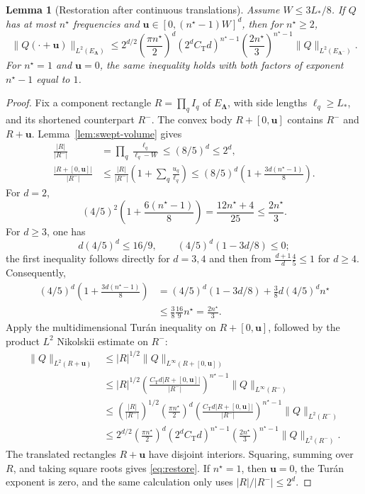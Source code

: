 \documentclass[11pt]{article}
\newtheorem{lemma}{Lemma}
\begin{document}
\begin{lemma}[Restoration after continuous translations]\label{lem:block-restoration}
Assume $W\le3L_*/8$. If $Q$ has at most $n^\star$ frequencies and $\bm u\in[0,(n^\star-1)W]^d$, then for $n^\star\ge2$,
\begin{equation}\label{eq:restore}
\|Q(\cdot+\bm u)\|_{L^2(E_{\bm\Lambda})}\le2^{d/2}\left(\frac{\pi n^\star}{2}\right)^d(2^dC_{\mathrm T}d)^{n^\star-1}\left(\frac{2n^\star}{3}\right)^{n^\star-1}\|Q\|_{L^2(E_{\bm\Lambda^-})}.
\end{equation}
For $n^\star=1$ and $\bm u=0$, the same inequality holds with both factors of exponent $n^\star-1$ equal to $1$.
\end{lemma}
\begin{proof}
Fix a component rectangle $R=\prod_q I_q$ of $E_{\bm\Lambda}$, with side lengths $\ell_q\ge L_*$, and its shortened counterpart $R^-$. The convex body $R+[0,\bm u]$ contains $R^-$ and $R+\bm u$. Lemma~\ref{lem:swept-volume} gives
\begin{align*}
\frac{|R|}{|R^-|}&=\prod_q\frac{\ell_q}{\ell_q-W}\le(8/5)^d\le2^d,\\
\frac{|R+[0,\bm u]|}{|R^-|}&\le\frac{|R|}{|R^-|}\left(1+\sum_q\frac{u_q}{\ell_q}\right)\le(8/5)^d\left(1+\frac{3d(n^\star-1)}8\right).
\end{align*}
For $d=2$,
\[
(4/5)^2\left(1+\frac{6(n^\star-1)}8\right)=\frac{12n^\star+4}{25}\le\frac{2n^\star}{3}.
\]
For $d\ge3$, one has
\[
d(4/5)^d\le16/9,\qquad (4/5)^d(1-3d/8)\le0;
\]
the first inequality follows directly for $d=3,4$ and then from $\frac{d+1}{d}\frac45\le1$ for $d\ge4$. Consequently,
\begin{align*}
(4/5)^d\left(1+\frac{3d(n^\star-1)}8\right)&=(4/5)^d(1-3d/8)+\frac38d(4/5)^d n^\star\\
&\le\frac38\frac{16}{9}n^\star=\frac{2n^\star}{3}.
\end{align*}
Apply the multidimensional Tur\'an inequality on $R+[0,\bm u]$, followed by the product $L^2$ Nikolskii estimate on $R^-$:
\begin{align*}
\|Q\|_{L^2(R+\bm u)}&\le|R|^{1/2}\|Q\|_{L^\infty(R+[0,\bm u])}\\
&\le|R|^{1/2}\left(\frac{C_{\mathrm T}d|R+[0,\bm u]|}{|R^-|}\right)^{n^\star-1}\|Q\|_{L^\infty(R^-)}\\
&\le\left(\frac{|R|}{|R^-|}\right)^{1/2}\left(\frac{\pi n^\star}{2}\right)^d\left(\frac{C_{\mathrm T}d|R+[0,\bm u]|}{|R^-|}\right)^{n^\star-1}\|Q\|_{L^2(R^-)}\\
&\le2^{d/2}\left(\frac{\pi n^\star}{2}\right)^d(2^dC_{\mathrm T}d)^{n^\star-1}\left(\frac{2n^\star}{3}\right)^{n^\star-1}\|Q\|_{L^2(R^-)}.
\end{align*}
The translated rectangles $R+\bm u$ have disjoint interiors. Squaring, summing over $R$, and taking square roots gives \eqref{eq:restore}. If $n^\star=1$, then $\bm u=0$, the Tur\'an exponent is zero, and the same calculation only uses $|R|/|R^-|\le2^d$.
\end{proof}
\end{document}
